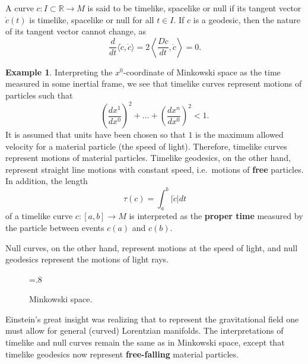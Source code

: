 \documentclass[10pt]{amsart}
\newcommand{\bbR}{\mathbb{R}}      %
\theoremstyle{definition}
\newtheorem{Example}[Thm]{Example}
\theoremstyle{remark}
\begin{document}

A curve $c:I \subset \bbR \to M$ is said to be timelike, spacelike or null if its tangent vector $\dot{c}(t)$ is timelike, spacelike or null for all $t \in I$. If $c$ is a geodesic, then the nature of its tangent vector cannot change, as
\[
\frac{d}{dt} \langle \dot{c}, \dot{c} \rangle = 2 \left\langle \frac{D\dot{c}}{dt}, \dot{c} \right\rangle = 0.
\]

\begin{Example}
Interpreting the $x^0$-coordinate of Minkowski space as the time measured in some inertial frame, we see that timelike curves represent motions of particles such that
\[
\left(\frac{dx^1}{dx^0}\right)^2 + \ldots + \left(\frac{dx^n}{dx^0}\right)^2 < 1.
\]
It is assumed that units have been chosen so that $1$ is the maximum allowed velocity for a material particle (the speed of light). Therefore, timelike curves represent motions of material particles. Timelike geodesics, on the other hand, represent straight line motions with constant speed, i.e.~motions of {\bf free} particles. In addition, the length
\[
\tau(c)=\int_a^b \left| \dot{c} \right| dt
\]
of a timelike curve $c:[a,b] \to M$ is interpreted as the {\bf proper time} measured by the particle between events $c(a)$ and $c(b)$.

Null curves, on the other hand, represent motions at the speed of light, and null geodesics represent the motions of light rays.
\end{Example}

\begin{figure}[h!]
\begin{center}
\epsfxsize=.8\textwidth
\leavevmode
{}
\end{center}
\caption{Minkowski space.} 
\end{figure}

Einstein's great insight was realizing that to represent the gravitational field one must allow for general (curved) Lorentzian manifolds. The interpretations of timelike and null curves remain the same as in Minkowski space, except that timelike geodesics now represent {\bf free-falling} material particles.
\end{document}
